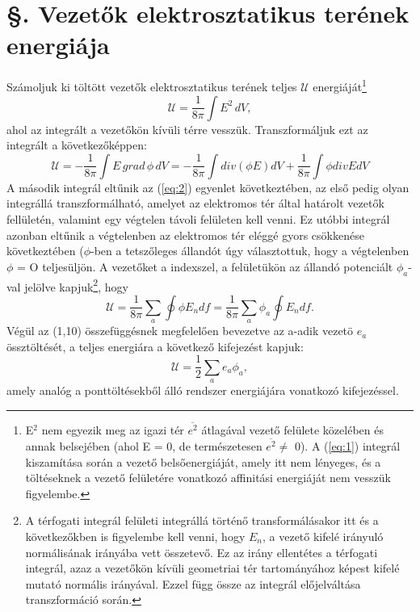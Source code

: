 \documentclass{article}
\begin{document}
\section{§. Vezetők elektrosztatikus terének energiája}
Számoljuk ki töltött vezetők elektrosztatikus terének teljes $\mathcal{U}$ energiáját\footnote[3]{E$^2$ nem egyezik meg az igazi tér $\overline{e^2}$ átlagával vezető felülete közelében és annak belsejében (ahol E = 0, de természetesen $\overline{e^2} \neq$ 0). A (\ref{eq:1}) integrál kiszamítása során a vezető belsőenergiáját, amely itt nem lényeges, és a töltéseknek a vezető felületére vonatkozó affinitási energiáját nem vesszük figyelembe.}
\begin{equation} \label{eq:1}
    \mathcal{U} = \frac{1}{8\pi} \int E^2 \, dV,
\end{equation}
ahol az integrált a vezetőkön kívüli térre vesszük. Transzformáljuk ezt az integrált a következőképpen:
\begin{equation} \label{eq:2}
    \mathcal{U} = -\frac{1}{8\pi} \int E \, grad \, \phi \, dV = -\frac{1}{8\pi} \int div (\phi E) dV + \frac{1}{8\pi} \int \phi div E dV
\end{equation}
A második integrál eltűnik az (\ref{eq:2}) egyenlet következtében, az első pedig olyan integrállá transzformálható, amelyet az elektromos tér által határolt vezetők fellületén, valamint egy végtelen távoli felületen kell venni. Ez utóbbi integrál azonban eltűnik a végtelenben az elektromos tér eléggé gyors csökkenése következtében ($\phi$-ben a tetszőleges állandót úgy választottuk, hogy a végtelenben $\phi$ = O teljesüljön. A vezetőket a indexszel, a felületükön az állandó potenciált $\phi_a$-val jelölve kapjuk\footnote[4]{A térfogati integrál felületi integrállá történő transformálásakor itt és a következőkben is figyelembe kell venni, hogy $E_n$, a vezető kifelé irányuló normálisának irányába vett összetevő. Ez az irány ellentétes a térfogati integrál, azaz a vezetőkön kívüli geometriai tér tartományához képest kifelé mutató normális irányával. Ezzel függ össze az integrál előjelváltása transzformáció során.}, hogy
\begin{equation} \label{eq:3}
    \mathcal{U} = \frac{1}{8\pi} \sum\limits_{a} \oint \phi E_n df = \frac{1}{8\pi} \sum\limits_{a} \phi_a \oint E_n df.
\end{equation}
Végül az (1,10) összefüggésnek megfelelően bevezetve az a-adik vezetö $e_a$ össztöltését, a teljes energiára a következő kifejezést kapjuk:
\begin{equation} \label{eq:4}
    \mathcal{U} = \frac{1}{2} \sum\limits_{a} e_a \phi_a ,
\end{equation}
amely analóg a ponttöltésekből álló rendszer energiájára vonatkozó kifejezéssel.
\end{document}
